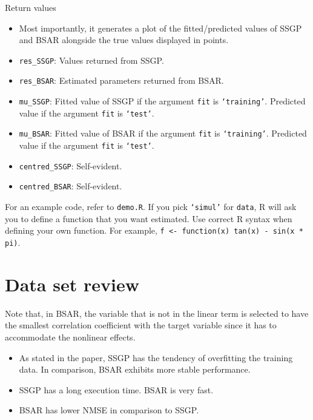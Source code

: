 \documentclass[11pt]{article}
\begin{document}
  Return values
    \begin{itemize}
      \item Most importantly, it generates a plot of the fitted/predicted values of SSGP and BSAR alongside the true values displayed in points.
      \item \texttt{res\_SSGP}: Values returned from SSGP.
      \item \texttt{res\_BSAR}: Estimated parameters returned from BSAR.
      \item \texttt{mu\_SSGP}: Fitted value of SSGP if the argument \texttt{fit} is \texttt{`training'}. Predicted value if the argument \texttt{fit} is \texttt{`test'}.
      \item \texttt{mu\_BSAR}: Fitted value of BSAR if the argument \texttt{fit} is \texttt{`training'}. Predicted value if the argument \texttt{fit} is \texttt{`test'}.
      \item \texttt{centred\_SSGP}: Self-evident.
      \item \texttt{centred\_BSAR}: Self-evident.
    \end{itemize}
For an example code, refer to \texttt{demo.R}. If you pick \texttt{`simul'} for \texttt{data}, \textsf{R} will ask you to define a function that you want estimated. Use correct \textsf{R} syntax when defining your own function. For example,
\texttt{f <- function(x) tan(x) - sin(x * pi)}.
\section{Data set review}
  Note that, in BSAR, the variable that is not in the linear term is selected to have the smallest correlation coefficient with the target variable since it has to accommodate the nonlinear effects.
  \begin{itemize}
  \item As stated in the paper, SSGP has the tendency of overfitting the training data. In comparison, BSAR exhibits more stable performance.
  \item SSGP has a long execution time. BSAR is very fast.
  \item BSAR has lower NMSE in comparison to SSGP.
  \end{itemize}
\end{document}
